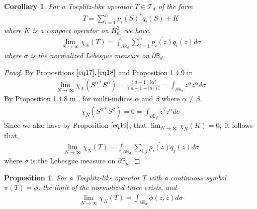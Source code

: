 \documentclass[article]{amsart}
\newtheorem{proposition}        [theorem]{Proposition}
\newtheorem{cor}[theorem]{Corollary}
\begin{document}
\begin{cor}
    For a Toeplitz-like operator $T \in \mathcal{T}_d$ of the form
    \begin{align*}
      T = \sum_{i=1}^n p_i(S)^*q_i(S) + K
    \end{align*}
    where $K$ is a compact operator on $H_d^2$, we have,
    \begin{align*}
        \lim_{N \rightarrow \infty}\chi_N (T) = \int_{\partial \mathbb{B}_d} \sum_{i=1}^n \overline{p_i(z)} q_i(z)d\sigma
    \end{align*}
    where $\sigma$ is the normalized Lebesgue measure on $\partial \mathbb{B}_d$.
\end{cor}
\begin{proof}
By Propositions $\ref{eq17}, \ref{eq18}$ and Proposition 1.4.9 in \cite{MR601594}
\begin{align*}
    \lim_{N \rightarrow \infty} \chi_N(S^{\alpha*} S^{\alpha})= \frac{(d-1)! \alpha!}{(d-1+|\alpha|)!} =\int_{\partial \mathbb{B}_d} \overline{z^{\alpha}} z^{\alpha} d\sigma
\end{align*}
By Proposition 1.4.8 in \cite{MR601594}, for multi-indices $\alpha$ and $\beta$ where $\alpha \neq \beta$,
\begin{align*}
    \chi_N(S^{\alpha *}S^{\beta}) = 0 = \int_{\partial \mathbb{B}_d} \overline{z^{\beta}} z^{\alpha} d\sigma
\end{align*}
Since we also have by Proposition $\ref{eq19}$, that $\lim_{N \rightarrow \infty}\chi_N(K)=0,$ it follows that,
\begin{align*}
        \lim_{N \rightarrow \infty}\chi_N (T) = \int_{\partial \mathbb{B}_d} \sum_{i,j} \overline{p_i(z)} q_j(z)d\sigma
    \end{align*}
    where $\sigma$ is the Lebesgue measure on $\partial \mathbb{B}_d$.
\end{proof}
\begin{proposition}
   For a Toeplitz-like operator $T$ with a continuous symbol $\pi(T)=\phi$,
   the limit of the normalized trace exists, and 
   \begin{align*}
   \lim _{N \rightarrow \infty} \chi_N(T) = \int_{\partial \mathbb{B}_d} \phi(z,\bar{z})d\sigma
    \end{align*}
\end{proposition}
\end{document}
